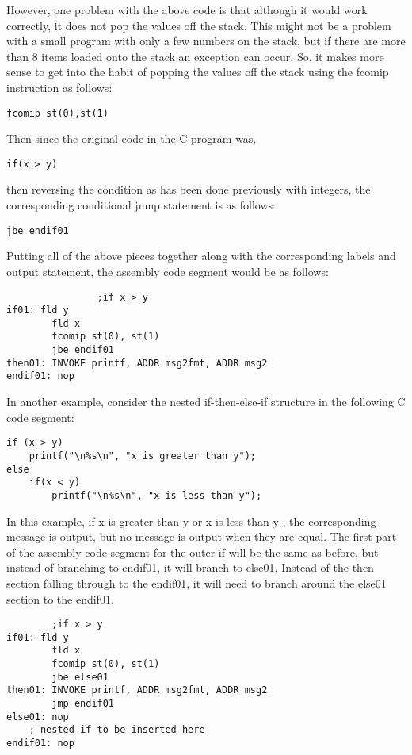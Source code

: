 \documentclass[10pt]{article}
\begin{document}
However, one problem with the above code is that although it would work correctly, it does not pop the values off the stack. This might not be a problem with a small program with only a few numbers on the stack, but if there are more than 8 items loaded onto the stack an exception can occur. So, it makes more sense to get into the habit of popping the values off the stack using the fcomip instruction as follows:

\begin{verbatim}
fcomip st(0),st(1)
\end{verbatim}

Then since the original code in the C program was,

\begin{verbatim}
if(x > y)
\end{verbatim}

then reversing the condition as has been done previously with integers, the corresponding conditional jump statement is as follows:

\begin{verbatim}
jbe endif01
\end{verbatim}

Putting all of the above pieces together along with the corresponding labels and output statement, the assembly code segment would be as follows:

\begin{verbatim}
                ;if x > y
if01: fld y
        fld x
        fcomip st(0), st(1)
        jbe endif01
then01: INVOKE printf, ADDR msg2fmt, ADDR msg2
endif01: nop
\end{verbatim}

In another example, consider the nested if-then-else-if structure in the following C code segment:

\begin{verbatim}
if (x > y)
    printf("\n%s\n", "x is greater than y");
else
    if(x < y)
        printf("\n%s\n", "x is less than y");
\end{verbatim}

In this example, if x is greater than y or x is less than y , the corresponding message is output, but no message is output when they are equal. The first part of the assembly code segment for the outer if will be the same as before, but instead of branching to endif01, it will branch to else01. Instead of the then section falling through to the endif01, it will need to branch around the else01 section to the endif01.

\begin{verbatim}
        ;if x > y
if01: fld y
        fld x
        fcomip st(0), st(1)
        jbe else01
then01: INVOKE printf, ADDR msg2fmt, ADDR msg2
        jmp endif01
else01: nop
    ; nested if to be inserted here
endif01: nop
\end{verbatim}
\end{document}
